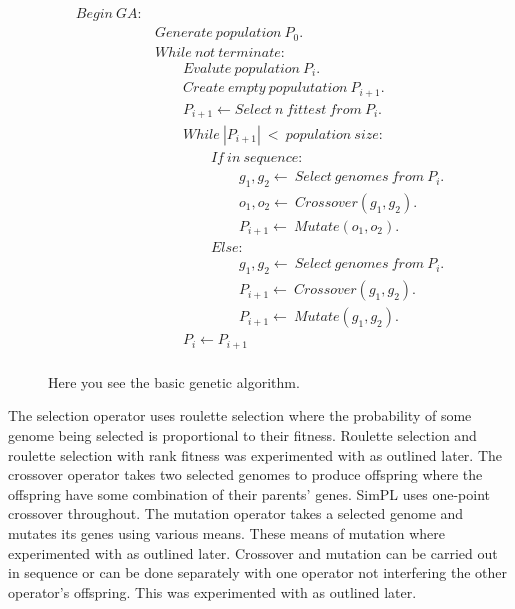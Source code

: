 \documentclass[a4paper,10pt]{article}
\begin{document}
\begin{figure}[H]
\begin{equation*}
\boxed{
\begin{aligned}
Begin \ GA: & \\
&Generate \ population \ P_0. \\
& While \ not \ terminate: \\
& \quad\quad Evalute \ population \ P_i. \\
& \quad\quad Create \ empty \ populutation \ P_{i+1}. \\
& \quad\quad P_{i+1} \longleftarrow Select \ n \ fittest \ from \ P_i. \\
& \quad\quad While \ |P_{i+1}| \ < \  population \ size: \\
& \quad\quad\quad\quad If \ in \ sequence: \\
& \quad\quad\quad\quad\quad\quad g_1,g_2 \longleftarrow \ Select \ genomes \ from \ P_i. \\
& \quad\quad\quad\quad\quad\quad o_1,o_2 \longleftarrow \ Crossover( g_1, g_2 ). \\
& \quad\quad\quad\quad\quad\quad P_{i+1} \longleftarrow \ Mutate( o_1, o_2 ). \\
& \quad\quad\quad\quad Else: \\
& \quad\quad\quad\quad\quad\quad g_1,g_2 \longleftarrow \ Select \ genomes \ from \ P_i. \\
& \quad\quad\quad\quad\quad\quad P_{i+1} \longleftarrow \ Crossover( g_1, g_2 ). \\
& \quad\quad\quad\quad\quad\quad P_{i+1} \longleftarrow \ Mutate( g_1, g_2 ). \\
& \quad\quad P_{i} \longleftarrow P_{i+1}\\
\end{aligned}
}
\end{equation*}
\caption{Here you see the basic genetic algorithm.}
\label{fig:ga}
\end{figure}

\vspace{3mm}

The selection operator uses roulette selection where the probability of some genome being selected is proportional to their fitness. Roulette selection and roulette selection with rank fitness was experimented with as outlined later. The crossover operator takes two selected genomes to produce offspring where the offspring have some combination of their parents' genes. SimPL uses one-point crossover throughout. The mutation operator takes a selected genome and mutates its genes using various means. These means of mutation where experimented with as outlined later. Crossover and mutation can be carried out in sequence or can be done separately with one operator not interfering the other operator's offspring. This was experimented with as outlined later.
\end{document}
